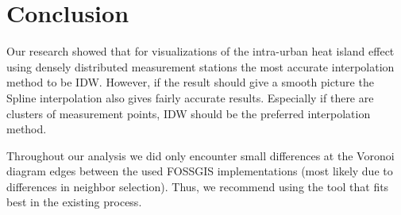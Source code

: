
\section{Conclusion}

Our research showed that for visualizations of the intra-urban heat island effect using densely distributed measurement stations the most accurate interpolation method to be IDW. However, if the result should give a smooth picture the Spline interpolation also gives fairly accurate results. Especially if there are clusters of measurement points, IDW should be the preferred interpolation method.

Throughout our analysis we did only encounter small differences at the Voronoi diagram edges between the used FOSSGIS implementations (most likely due to differences in neighbor selection). Thus, we recommend using the tool that fits best in the existing process.
